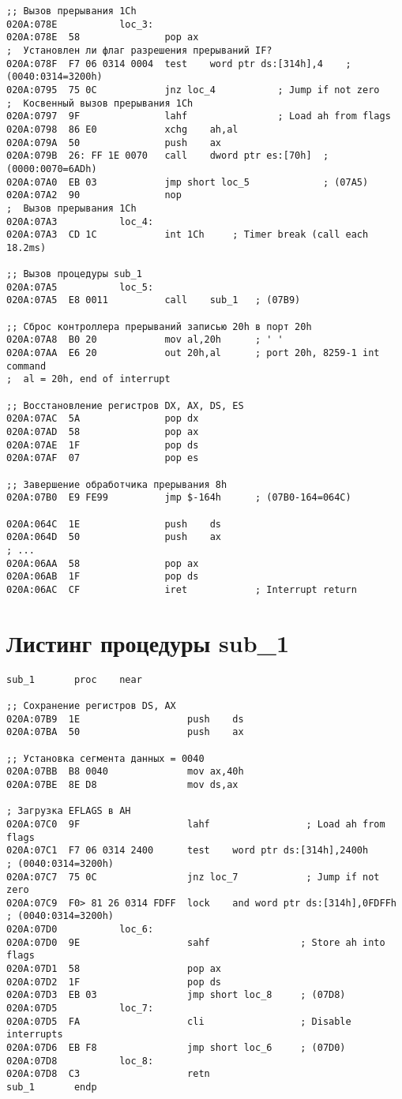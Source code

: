 \documentclass[a4paper,14pt]{extreport}
\begin{document}
\begin{lstlisting}[style={asm}]
;; Вызов прерывания 1Ch
020A:078E			loc_3:
020A:078E  58				pop	ax
;  Установлен ли флаг разрешения прерываний IF?
020A:078F  F7 06 0314 0004	test	word ptr ds:[314h],4	; (0040:0314=3200h)
020A:0795  75 0C			jnz	loc_4			; Jump if not zero
;  Косвенный вызов прерывания 1Ch
020A:0797  9F				lahf				; Load ah from flags
020A:0798  86 E0			xchg	ah,al
020A:079A  50				push	ax
020A:079B  26: FF 1E 0070	call	dword ptr es:[70h]	; (0000:0070=6ADh)
020A:07A0  EB 03			jmp	short loc_5				; (07A5)
020A:07A2  90				nop
;  Вызов прерывания 1Сh
020A:07A3			loc_4:
020A:07A3  CD 1C			int	1Ch		; Timer break (call each 18.2ms)

;; Вызов процедуры sub_1
020A:07A5			loc_5:
020A:07A5  E8 0011			call	sub_1	; (07B9)

;; Сброс контроллера прерываний записью 20h в порт 20h
020A:07A8  B0 20			mov	al,20h		; ' '
020A:07AA  E6 20			out	20h,al		; port 20h, 8259-1 int command
;  al = 20h, end of interrupt

;; Восстановление регистров DX, AX, DS, ES
020A:07AC  5A				pop	dx
020A:07AD  58				pop	ax
020A:07AE  1F				pop	ds
020A:07AF  07				pop	es

;; Завершение обработчика прерывания 8h
020A:07B0  E9 FE99			jmp	$-164h		; (07B0-164=064C)

020A:064C  1E				push	ds
020A:064D  50				push	ax
; ...
020A:06AA  58				pop	ax
020A:06AB  1F				pop	ds
020A:06AC  CF				iret			; Interrupt return
\end{lstlisting}

\section*{Листинг процедуры sub\_1}

\begin{lstlisting}[style={asm}]
					sub_1		proc	near

;; Сохранение регистров DS, AX
020A:07B9  1E					push	ds
020A:07BA  50					push	ax

;; Установка сегмента данных = 0040
020A:07BB  B8 0040				mov	ax,40h
020A:07BE  8E D8				mov	ds,ax

; Загрузка EFLAGS в AH
020A:07C0  9F					lahf				 ; Load ah from flags
020A:07C1  F7 06 0314 2400		test	word ptr ds:[314h],2400h		; (0040:0314=3200h)
020A:07C7  75 0C				jnz	loc_7			 ; Jump if not zero
020A:07C9  F0> 81 26 0314 FDFF	lock	and	word ptr ds:[314h],0FDFFh	; (0040:0314=3200h)
020A:07D0			loc_6:
020A:07D0  9E					sahf				; Store ah into flags
020A:07D1  58					pop	ax
020A:07D2  1F					pop	ds
020A:07D3  EB 03				jmp	short loc_8		; (07D8)
020A:07D5			loc_7:
020A:07D5  FA					cli					; Disable interrupts
020A:07D6  EB F8				jmp	short loc_6		; (07D0)
020A:07D8			loc_8:
020A:07D8  C3					retn
sub_1		endp
\end{lstlisting}
\end{document}
